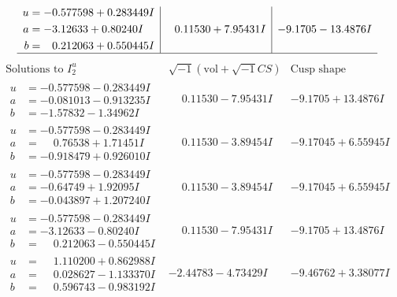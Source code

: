 \documentclass[1p]{elsarticle_modified}
\theoremstyle{definition}
\newcommand{\I}{\sqrt{-1}}
\begin{document}
$$\begin{array}{c|c|c}
\begin{aligned}
u &= -0.577598 + 0.283449 I \\
a &= -3.12633 + 0.80240 I \\
b &= \phantom{-}0.212063 + 0.550445 I\end{aligned}
 & \phantom{-}0.11530 + 7.95431 I & -9.1705 - 13.4876 I\\
 \hline 
 \end{array}$$\newpage$$\begin{array}{c|c|c}  
\text{Solutions to }I^u_{2}& \I (\text{vol} + \sqrt{-1}CS) & \text{Cusp shape}\\
 \hline 
\begin{aligned}
u &= -0.577598 - 0.283449 I \\
a &= -0.081013 - 0.913235 I \\
b &= -1.57832 - 1.34962 I\end{aligned}
 & \phantom{-}0.11530 - 7.95431 I & -9.1705 + 13.4876 I \\ \hline\begin{aligned}
u &= -0.577598 - 0.283449 I \\
a &= \phantom{-}0.76538 + 1.71451 I \\
b &= -0.918479 + 0.926010 I\end{aligned}
 & \phantom{-}0.11530 - 3.89454 I & -9.17045 + 6.55945 I \\ \hline\begin{aligned}
u &= -0.577598 - 0.283449 I \\
a &= -0.64749 + 1.92095 I \\
b &= -0.043897 + 1.207240 I\end{aligned}
 & \phantom{-}0.11530 - 3.89454 I & -9.17045 + 6.55945 I \\ \hline\begin{aligned}
u &= -0.577598 - 0.283449 I \\
a &= -3.12633 - 0.80240 I \\
b &= \phantom{-}0.212063 - 0.550445 I\end{aligned}
 & \phantom{-}0.11530 - 7.95431 I & -9.1705 + 13.4876 I \\ \hline\begin{aligned}
u &= \phantom{-}1.110200 + 0.862988 I \\
a &= \phantom{-}0.028627 - 1.133370 I \\
b &= \phantom{-}0.596743 - 0.983192 I\end{aligned}
 & -2.44783 - 4.73429 I & -9.46762 + 3.38077 I \\ \hline\begin{aligned}

\end{aligned}
\end{array}$$
\end{document}
